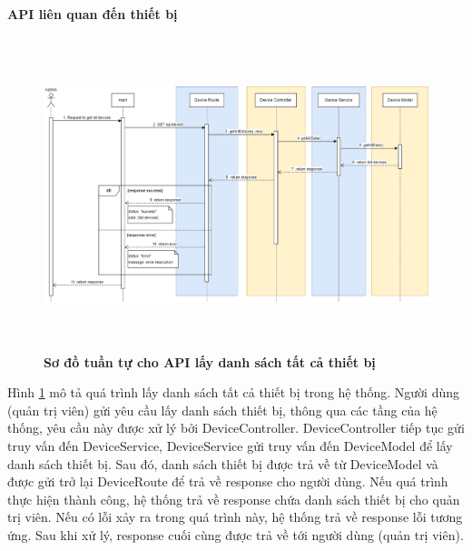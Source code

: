 
\paragraph{API liên quan đến thiết bị}
\mbox{}

\begin{figure}[H]
  \centering
  \includegraphics[width=16cm,height=9cm]{Images/sequence_api/getAllDevices.png}
  \caption[Sơ đồ tuần tự cho API lấy danh sách tất cả thiết bị ]{\bfseries \fontsize{12pt}{0pt}
  \selectfont Sơ đồ tuần tự cho API lấy danh sách tất cả thiết bị }
  \label{api_getAllDevices} %
\end{figure}
Hình \ref{api_getAllDevices} mô tả quá trình lấy danh sách tất cả thiết bị trong hệ thống. Người dùng (quản trị viên) gửi yêu cầu lấy danh sách thiết bị, thông qua các tầng của hệ thống, 
yêu cầu này được xử lý bởi DeviceController. DeviceController tiếp tục gửi truy vấn đến DeviceService, DeviceService gửi truy vấn đến DeviceModel để lấy danh sách thiết bị. Sau đó, danh sách thiết bị được trả về từ DeviceModel và được gửi trở lại DeviceRoute
 để trả về response cho người dùng. Nếu quá trình thực hiện thành công, hệ thống trả về response chứa danh sách thiết bị cho quản trị viên. Nếu có lỗi xảy ra trong quá trình này, hệ thống trả về response lỗi tương ứng. Sau khi xử lý, response cuối cùng được 
trả về tới người dùng (quản trị viên).

